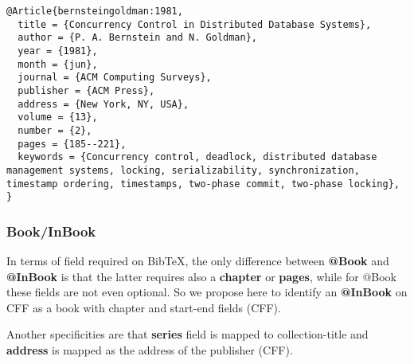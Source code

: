 \documentclass[
]{article}
\begin{document}
\begin{verbatim}
@Article{bernsteingoldman:1981,
  title = {Concurrency Control in Distributed Database Systems},
  author = {P. A. Bernstein and N. Goldman},
  year = {1981},
  month = {jun},
  journal = {ACM Computing Surveys},
  publisher = {ACM Press},
  address = {New York, NY, USA},
  volume = {13},
  number = {2},
  pages = {185--221},
  keywords = {Concurrency control, deadlock, distributed database management systems, locking, serializability, synchronization, timestamp ordering, timestamps, two-phase commit, two-phase locking},
}
\end{verbatim}

\hypertarget{bookinbook}{%
\subsubsection{Book/InBook}\label{bookinbook}}

In terms of field required on BibTeX, the only difference between
\textbf{@Book} and \textbf{@InBook} is that the latter requires also a
\textbf{chapter} or \textbf{pages}, while for @Book these fields are not
even optional. So we propose here to identify an \textbf{@InBook} on CFF
as a book with chapter and start-end fields (CFF).

Another specificities are that \textbf{series} field is mapped to
collection-title and \textbf{address} is mapped as the address of the
publisher (CFF).
\end{document}
